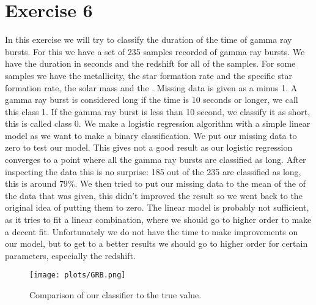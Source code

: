 \section{Exercise 6}
In this exercise we will try to classify the duration of the time of gamma ray bursts. For this we have a set of 235 samples recorded of gamma ray bursts. We have the duration in seconds and the redshift for all of the samples. For some samples we have the metallicity, the star formation rate and the specific star formation rate, the solar mass and the . Missing data is given as a minus 1.
A gamma ray burst is considered long if the time is 10 seconds or longer, we call this class 1. If the gamma ray burst is less than 10 second, we classify it as short, this is called class 0. We make a logistic regression algorithm with a simple linear model as we want to make a binary classification. We put our missing data to zero to test our model. This gives not a good result as our logistic regression converges to a point where all the gamma ray bursts are classified as long. After inspecting the data this is no surprise: 185 out of the 235 are classified as long, this is around $79\%$. We then tried to put our missing data to the mean of the of the data that was given, this didn't improved the result so we went back to the original idea of putting them to zero. The linear model is probably not sufficient, as it tries to fit a linear combination, where we should go to higher order to make a decent fit. Unfortunately we do not have the time to make improvements on our model, but to get to a better results we should go to higher order for certain parameters, especially the redshift.

\begin{figure}
   \centering
   \texttt{[image: plots/GRB.png]}
      \caption{Comparison of our classifier to the true value.}
\end{figure}



